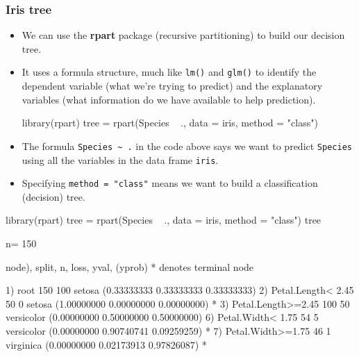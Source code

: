 \documentclass[a4paper]{article}\usepackage[]{graphicx}\usepackage[]{xcolor}
\begin{document}
\subsubsection{Iris tree}
\begin{itemize}
	\item We can use the \textbf{rpart} package (recursive partitioning) to build our decision tree.
	\item It uses a formula structure, much like \lstinline|lm()| and \lstinline|glm()| to identify the dependent variable (what we're trying to predict) and the explanatory variables (what information do we have available to help prediction).
\begin{Schunk}
\begin{Sinput}
library(rpart)
tree = rpart(Species ~ ., data = iris, method = "class")
\end{Sinput}
\end{Schunk}
	\item The formula \lstinline|Species ~ .| in the code above says we want to predict \lstinline|Species| using all the variables in the data frame \lstinline|iris|.
	\item Specifying \lstinline|method = "class"| means we want to build a classification (decision) tree.
\end{itemize}
\begin{Schunk}
\begin{Sinput}
library(rpart)
tree = rpart(Species ~ ., data = iris, method = "class")
tree
\end{Sinput}
\begin{Soutput}
n= 150 

node), split, n, loss, yval, (yprob)
      * denotes terminal node

1) root 150 100 setosa (0.33333333 0.33333333 0.33333333)  
  2) Petal.Length< 2.45 50   0 setosa (1.00000000 0.00000000 0.00000000) *
  3) Petal.Length>=2.45 100  50 versicolor (0.00000000 0.50000000 0.50000000)  
    6) Petal.Width< 1.75 54   5 versicolor (0.00000000 0.90740741 0.09259259) *
    7) Petal.Width>=1.75 46   1 virginica (0.00000000 0.02173913 0.97826087) *
\end{Soutput}
\end{Schunk}
\end{document}
